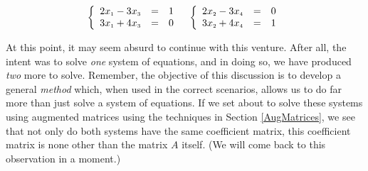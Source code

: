 \[\begin{array}{cc}

\left\{ \begin{array}{rcr} 2x_{\mbox{\tiny$1$}}-3x_{\mbox{\tiny$3$}} & = & 1 \\ 3x_{\mbox{\tiny$1$}}+4x_{\mbox{\tiny$3$}} & = & 0 \\ \end{array} \right.

&

\left\{ \begin{array}{rcr} 2x_{\mbox{\tiny$2$}}-3x_{\mbox{\tiny$4$}} & = & 0 \\ 3x_{\mbox{\tiny$2$}}+4x_{\mbox{\tiny$4$}} & = & 1 \\ \end{array} \right.

\end{array}\]

At this point, it may seem absurd to continue with this venture.  After all, the intent was to solve \textit{one} system of equations, and in doing so, we have produced \textit{two} more to solve.  Remember, the objective of this discussion is to develop a general \textit{method} which, when used in the correct scenarios, allows us to do far more than just solve a system of equations.  If we set about to solve these systems using augmented matrices using the techniques in Section \ref{AugMatrices}, we see that not only do both systems have the same coefficient matrix, this coefficient matrix is none other than the matrix $A$ itself. (We will come back to this observation in a moment.)  

